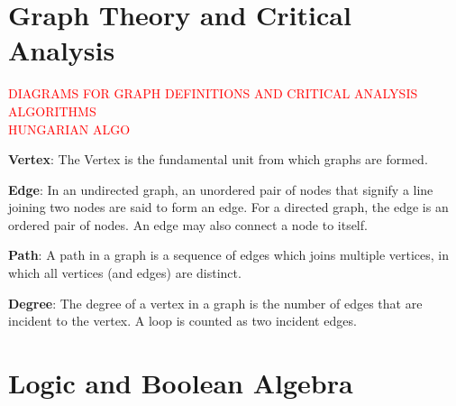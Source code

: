 %
%
%




\section{Graph Theory and Critical Analysis} \label{Module1:GraphTheoryCriticalAnalysis}

\textcolor{red} {DIAGRAMS FOR GRAPH DEFINITIONS  AND CRITICAL ANALYSIS ALGORITHMS}\\
\textcolor{red}{HUNGARIAN ALGO}
\begin{defn}\label{mod1:defn:Vertex}
   \textbf{Vertex}: The Vertex is the fundamental unit from which graphs are formed.
\end{defn}

\begin{defn}\label{mod1:defn:Edge}
   \textbf{Edge}: In an undirected graph, an unordered pair of nodes that signify  a line joining  two nodes are said to form an edge. For a directed graph, the edge is an ordered pair of nodes. An edge may also connect a node to itself.
\end{defn}

\begin{defn}\label{mod1:defn:Path}
    \textbf{Path}: A path in a graph is a sequence of edges which joins multiple vertices, in which all vertices (and edges) are distinct.
\end{defn}

\begin{defn}\label{mod1:defn:Degree}
   \textbf{Degree}: The degree of a vertex  in a graph is the number of edges that are incident to the vertex. A loop is counted as two incident edges.
\end{defn}

\section{Logic and Boolean Algebra}

